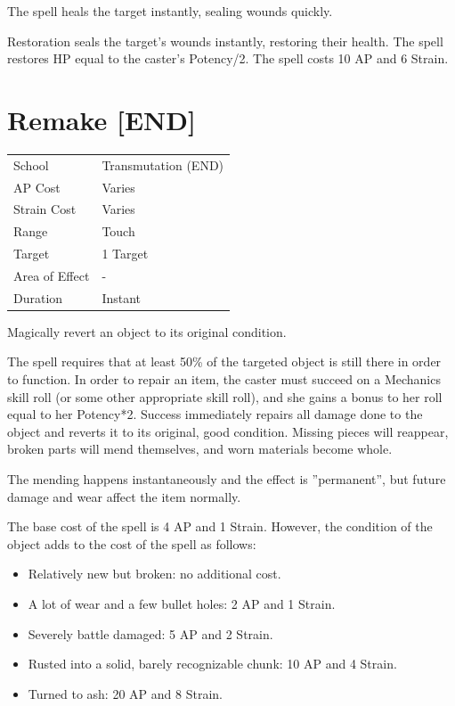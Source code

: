 \documentclass[11pt,a4paper,twocolumn]{book}
\begin{document}
\medskip

The spell heals the target instantly, sealing wounds quickly.

Restoration seals the target's wounds instantly, restoring their health. The spell restores HP equal to the caster's Potency/2. The spell costs 10 AP and 6 Strain.

\vfill


\section*{Remake [END]}
{
	\begin{tabu} to 75mm{| X[l,4] | X[l,7] |}
		\hline
		School 			& Transmutation (END) 	\\
        AP Cost	      	& Varies 				\\
        Strain Cost     & Varies 				\\
        Range     		& Touch					\\
        Target      	& 1 Target				\\
        Area of Effect  & -  	 				\\
        Duration     	& Instant				\\ \hline
	\end{tabu}
		
}

\medskip

Magically revert an object to its original condition.

The spell requires that at least 50\% of the targeted object is still there in order to function. In order to repair an item, the caster must succeed on a Mechanics skill roll (or some other appropriate skill roll), and she gains a bonus to her roll equal to her Potency*2. Success immediately repairs all damage done to the object and reverts it to its original, good condition. Missing pieces will reappear, broken parts will mend themselves, and worn materials become whole.

The mending happens instantaneously and the effect is ''permanent'', but future damage and wear affect the item normally.

The base cost of the spell is 4 AP and 1 Strain. However, the condition of the object adds to the cost of the spell as follows:
\begin{itemize}
  \item Relatively new but broken: no additional cost.
  \item A lot of wear and a few bullet holes: 2 AP and 1 Strain.
  \item Severely battle damaged: 5 AP and 2 Strain.
  \item Rusted into a solid, barely recognizable chunk: 10 AP and 4 Strain.
  \item Turned to ash: 20 AP and 8 Strain.
\end{itemize}
\end{document}
